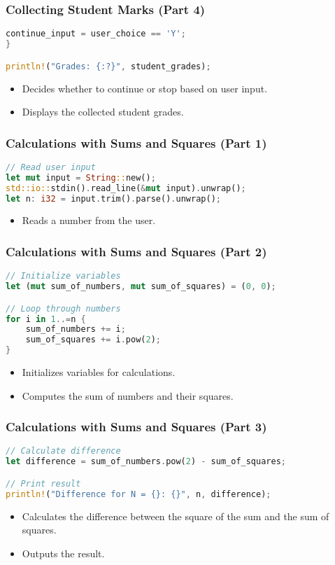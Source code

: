 \documentclass[aspectratio=169, table]{beamer}
\begin{document}
\begin{frame}[fragile]
\frametitle{Collecting Student Marks (Part 4)}
\begin{lstlisting}[language=Rust]
	continue_input = user_choice == 'Y';
}

println!("Grades: {:?}", student_grades);
\end{lstlisting}
\begin{itemize}
\item Decides whether to continue or stop based on user input.
\item Displays the collected student grades.
\end{itemize}
\end{frame}

\begin{frame}[fragile]
\frametitle{Calculations with Sums and Squares (Part 1)}
\begin{lstlisting}[language=Rust]
// Read user input
let mut input = String::new();
std::io::stdin().read_line(&mut input).unwrap();
let n: i32 = input.trim().parse().unwrap();
\end{lstlisting}
\begin{itemize}
\item Reads a number from the user.
\end{itemize}
\end{frame}

\begin{frame}[fragile]
\frametitle{Calculations with Sums and Squares (Part 2)}
\begin{lstlisting}[language=Rust]
// Initialize variables
let (mut sum_of_numbers, mut sum_of_squares) = (0, 0);

// Loop through numbers
for i in 1..=n { 
	sum_of_numbers += i;   
	sum_of_squares += i.pow(2);  
}
\end{lstlisting}
\begin{itemize}
\item Initializes variables for calculations.
\item Computes the sum of numbers and their squares.
\end{itemize}
\end{frame}

\begin{frame}[fragile]
\frametitle{Calculations with Sums and Squares (Part 3)}
\begin{lstlisting}[language=Rust]
// Calculate difference
let difference = sum_of_numbers.pow(2) - sum_of_squares; 

// Print result
println!("Difference for N = {}: {}", n, difference);  
\end{lstlisting}
\begin{itemize}
\item Calculates the difference between the square of the sum and the sum of squares.
\item Outputs the result.
\end{itemize}
\end{frame}
\end{document}
